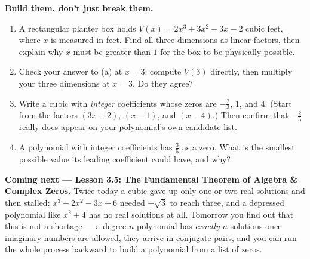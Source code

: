 \documentclass[10pt]{article}
\begin{document}
\begin{extensionbox}
\textbf{Build them, don't just break them.}
\begin{enumerate}[label=(\alph*), leftmargin=1.8em, itemsep=5pt]
  \item A rectangular planter box holds $V(x) = 2x^3 + 3x^2 - 3x - 2$ cubic feet, where $x$ is
        measured in feet. Find all three dimensions as linear factors, then explain why $x$ must be
        greater than $1$ for the box to be physically possible.
  \item Check your answer to (a) at $x = 3$: compute $V(3)$ directly, then multiply your three
        dimensions at $x = 3$. Do they agree?
  \item Write a cubic with \emph{integer} coefficients whose zeros are $-\tfrac23$, $1$, and $4$.
        (Start from the factors $(3x+2)$, $(x-1)$, and $(x-4)$.) Then confirm that $-\tfrac23$ really
        does appear on your polynomial's own candidate list.
  \item A polynomial with integer coefficients has $\tfrac{3}{5}$ as a zero. What is the smallest
        possible value its leading coefficient could have, and why?
\end{enumerate}
\end{extensionbox}

\begin{spiralbox}
\textbf{Coming next --- Lesson 3.5: The Fundamental Theorem of Algebra \& Complex Zeros.} Twice today
a cubic gave up only one or two real solutions and then stalled: $x^3-2x^2-3x+6$ needed
$\pm\sqrt{3}$ to reach three, and a depressed polynomial like $x^2+4$ has no real solutions at all.
Tomorrow you find out that this is not a shortage --- a degree-$n$ polynomial has \emph{exactly} $n$
solutions once imaginary numbers are allowed, they arrive in conjugate pairs, and you can run the
whole process backward to build a polynomial from a list of zeros.
\end{spiralbox}
\end{document}
